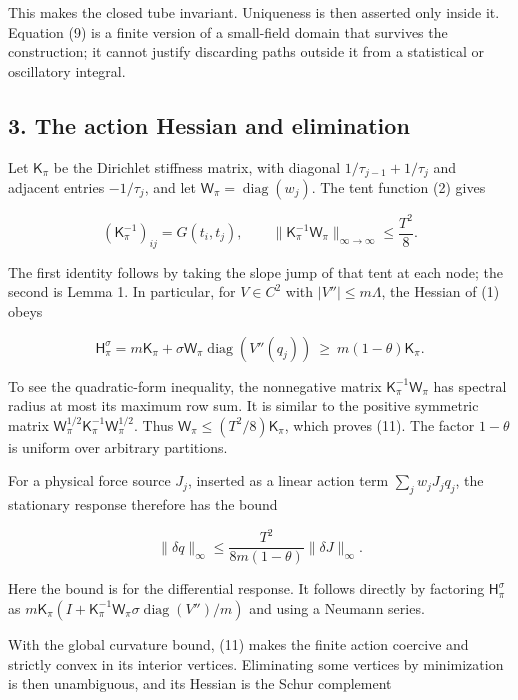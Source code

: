 \documentclass[11pt,a4paper]{article}
\begin{document}
This makes the closed tube invariant. Uniqueness is then asserted only
inside it. Equation (9) is a finite version of a small-field domain that
survives the construction; it cannot justify discarding paths outside it
from a statistical or oscillatory integral.

\subsection{3. The action Hessian and
elimination}\label{the-action-hessian-and-elimination}

Let \(\mathsf K_\pi\) be the Dirichlet stiffness matrix, with diagonal
\(1/\tau_{j-1}+1/\tau_j\) and adjacent entries \(-1/\tau_j\), and let
\(\mathsf W_\pi=\operatorname{diag}(w_j)\). The tent function (2) gives

\[
 (\mathsf K_\pi^{-1})_{ij}=G(t_i,t_j),\qquad
 \|\mathsf K_\pi^{-1}\mathsf W_\pi\|_{\infty\to\infty}
       \le\frac{T^2}{8}.
 \tag{10}
\]

The first identity follows by taking the slope jump of that tent at each
node; the second is Lemma 1. In particular, for \(V\in C^2\) with
\(|V''|\le m\Lambda\), the Hessian of (1) obeys

\[
 \mathsf H_\pi^\sigma
   =m\mathsf K_\pi+\sigma\mathsf W_\pi
             \operatorname{diag}(V''(q_j))
   \ \ge\ m(1-\theta)\mathsf K_\pi.
 \tag{11}
\]

To see the quadratic-form inequality, the nonnegative matrix
\(\mathsf K_\pi^{-1}\mathsf W_\pi\) has spectral radius at most its
maximum row sum. It is similar to the positive symmetric matrix
\(\mathsf W_\pi^{1/2}\mathsf K_\pi^{-1}\mathsf W_\pi^{1/2}\). Thus
\(\mathsf W_\pi\le(T^2/8)\mathsf K_\pi\), which proves (11). The factor
\(1-\theta\) is uniform over arbitrary partitions.

For a physical force source \(J_j\), inserted as a linear action term
\(\sum_jw_jJ_jq_j\), the stationary response therefore has the bound

\[
 \|\delta q\|_\infty\le
 \frac{T^2}{8m(1-\theta)}\|\delta J\|_\infty.
 \tag{12}
\]

Here the bound is for the differential response. It follows directly by
factoring \(\mathsf H_\pi^\sigma\) as
\(m\mathsf K_\pi(I+\mathsf K_\pi^{-1}\mathsf W_\pi
\sigma\operatorname{diag}(V'')/m)\) and using a Neumann series.

With the global curvature bound, (11) makes the finite action coercive
and strictly convex in its interior vertices. Eliminating some vertices
by minimization is then unambiguous, and its Hessian is the Schur
complement
\end{document}
